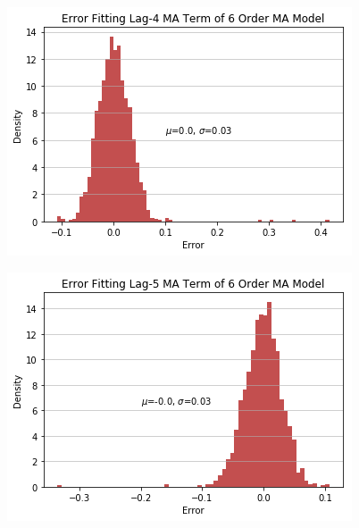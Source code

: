 \documentclass[oneside,12pt,openany]{book}
\begin{document}
	\begin{figure}[hbt!]
		\centering
		\includegraphics[width=.85\linewidth]{images/MA6ModelMA4CoefDist.png}
	\end{figure}
	\begin{figure}[hbt!]
		\centering
		\includegraphics[width=.85\linewidth]{images/MA6ModelMA5CoefDist.png}
	\end{figure}
	
\end{document}
